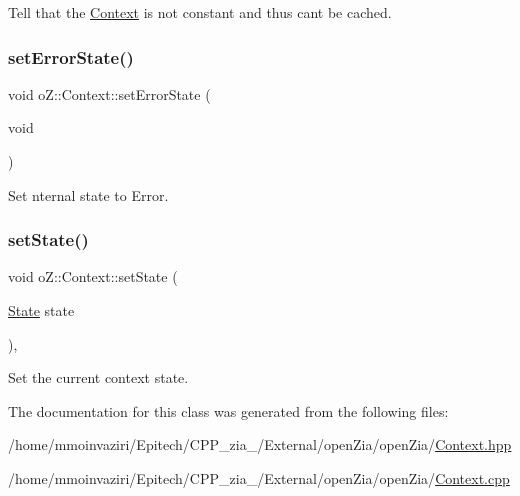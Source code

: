 Tell that the \mbox{\hyperlink{classo_z_1_1_context}{Context}} is not constant and thus can\textquotesingle{}t be cached. 

\mbox{\label{classo_z_1_1_context_a036d993634650ee8414c2f12d49d0204}} 
\subsubsection{\texorpdfstring{setErrorState()}{setErrorState()}}
{\footnotesize\ttfamily void o\+Z\+::\+Context\+::set\+Error\+State (\begin{DoxyParamCaption}\item[{void}]{ }\end{DoxyParamCaption})\hspace{0.3cm}{\ttfamily [inline]}}



Set nternal state to Error. 

\mbox{\label{classo_z_1_1_context_ad64db4a4b4391e8b765338cc227f948b}} 
\subsubsection{\texorpdfstring{setState()}{setState()}}
{\footnotesize\ttfamily void o\+Z\+::\+Context\+::set\+State (\begin{DoxyParamCaption}\item[{\mbox{\hyperlink{namespaceo_z_a356b278f7c65def0cae75fca8cae268e}{State}}}]{state }\end{DoxyParamCaption})\hspace{0.3cm}{\ttfamily [inline]}, {\ttfamily [noexcept]}}



Set the current context\textquotesingle{} state. 



The documentation for this class was generated from the following files\+:\begin{DoxyCompactItemize}
\item 
/home/mmoinvaziri/\+Epitech/\+C\+P\+P\+\_\+zia\+\_/\+External/open\+Zia/open\+Zia/\mbox{\hyperlink{_context_8hpp}{Context.\+hpp}}\item 
/home/mmoinvaziri/\+Epitech/\+C\+P\+P\+\_\+zia\+\_/\+External/open\+Zia/open\+Zia/\mbox{\hyperlink{_context_8cpp}{Context.\+cpp}}\end{DoxyCompactItemize}
